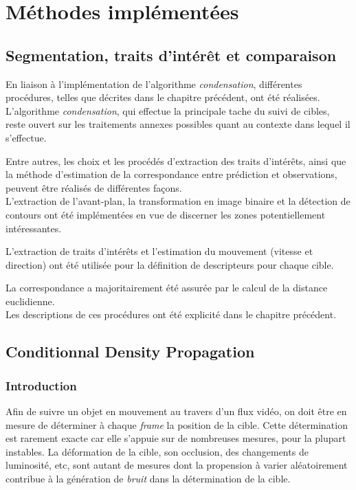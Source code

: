 \documentclass[a4paper,12pt]{report}
\begin{document}
\pagebreak
\chapter{Méthodes implémentées}

\section{Segmentation, traits d'intérêt et comparaison}
En liaison à l'implémentation de l'algorithme \textit{condensation}, différentes procédures, telles que décrites dans le chapitre précédent, ont été réalisées.\\

L'algorithme \textit{condensation}, qui effectue la principale tache du suivi de cibles, reste ouvert sur les traitements annexes possibles quant au contexte dans lequel il s'effectue. 

Entre autres, les choix et les procédés d'extraction des traits d'intérêts, ainsi que la méthode d'estimation de la correspondance entre prédiction et observations, peuvent être réalisés de différentes façons.\\

L'extraction de l'avant-plan, la transformation en image binaire et la détection de contours ont été implémentées en vue de discerner les zones potentiellement intéressantes.

L'extraction de traits d'intérêts et l'estimation du mouvement (vitesse et direction) ont été utilisée pour la définition de descripteurs pour chaque cible.

La correspondance a majoritairement été assurée par le calcul de la distance euclidienne.\\

Les descriptions de ces procédures ont été explicité dans le chapitre précédent.


\section{Conditionnal Density Propagation}
\subsection{Introduction}
Afin de suivre un objet en mouvement au travers d'un flux vidéo, on doit être en mesure de déterminer à chaque \textit{frame} la position de la cible. 
Cette détermination est rarement exacte car elle s'appuie sur de nombreuses mesures, pour la plupart instables. 
La déformation de la cible, son occlusion, des changements de luminosité, etc, sont autant de mesures dont la propension à varier aléatoirement contribue à la génération de \emph{bruit} dans la détermination de la cible.\\
\end{document}
